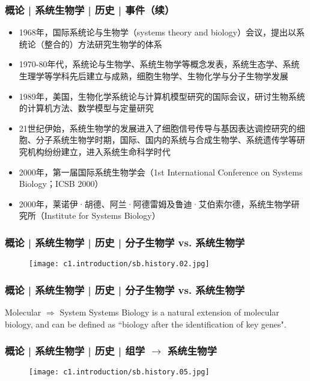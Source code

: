 \begin{frame}
  \frametitle{概论 | 系统生物学 | 历史 | 事件（续）}
  \begin{itemize}
    \item 1968年，国际系统论与生物学（systems theory and biology）会议，提出以系统论（整合的）方法研究生物学的体系
    \item 1970-80年代，系统论与生物学、系统生物学等概念发表，系统生态学、系统生理学等学科先后建立与成熟，细胞生物学、生物化学与分子生物学发展
    \item 1989年，美国，生物化学系统论与计算机模型研究的国际会议，研讨生物系统的计算机方法、数学模型与定量研究
    \item 21世纪伊始，系统生物学的发展进入了细胞信号传导与基因表达调控研究的细胞、分子系统生物学时期，国际、国内的系统与合成生物学、系统遗传学等研究机构纷纷建立，进入系统生命科学时代
    \item 2000年，第一届国际系统生物学会（1st International Conference on Systems Biology；ICSB 2000）
    \item 2000年，莱诺伊·胡德、阿兰·阿德雷姆及鲁迪·艾伯索尔德，系统生物学研究所（Institute for Systems Biology）
  \end{itemize}
\end{frame}

\begin{frame}
  \frametitle{概论 | 系统生物学 | 历史 | 分子生物学 vs. 系统生物学}
  \begin{figure}
    \centering
    \texttt{[image: c1.introduction/sb.history.02.jpg]}
  \end{figure}
\end{frame}

\begin{frame}
  \frametitle{概论 | 系统生物学 | 历史 | 分子生物学 vs. 系统生物学}
  \begin{block}{Molecular $\Rightarrow$ System}
  Systems Biology is a natural extension of molecular biology, and can be defined as ``biology after the identification of key genes".
  \end{block}
\end{frame}

\begin{frame}
  \frametitle{概论 | 系统生物学 | 历史 | 组学 $\rightarrow$ 系统生物学}
  \begin{figure}
    \centering
    \texttt{[image: c1.introduction/sb.history.05.jpg]}
  \end{figure}
\end{frame}

